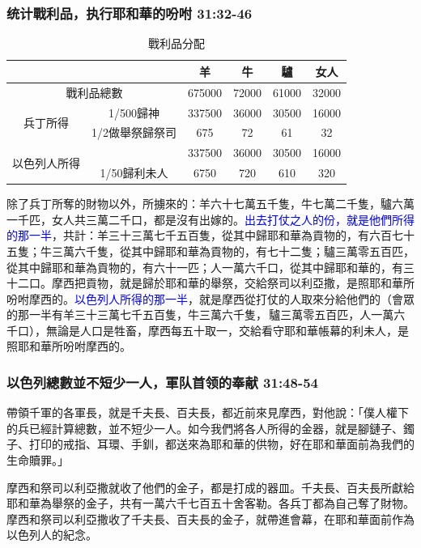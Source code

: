 \subsubsection{统计戰利品，执行耶和華的吩咐 31:32-46}
\begin{table}
\centering
\begin{tabular}{|c|c|c|c|c|c|}
\hline
\hline
\multicolumn{2}{|c|}{}     &羊    &    牛&  驢   & 女人 \\ \hline\hline 
\multicolumn{2}{|c|}{戰利品總數}           &675000&72000 & 61000 & 32000\\ \cline{2-6}\hline
\multirow{2}{*}{兵丁所得}&1/500歸神& 337500&36000&30500&16000 \\ 
\multicolumn{1}{|c|}{}   &1/2做舉祭歸祭司&675    &72   &61   &32 \\ \cline{2-6}\hline
\multirow{2}{*}{以色列人所得}  && 337500 & 36000 &30500 &  16000 \\ 
\multicolumn{1}{|c|}{}         &1/50歸利未人&6750 & 720 &610 &320 \\ \cline{2-6}\hline
\end{tabular}
\caption{戰利品分配 }
\end{table}
除了兵丁所奪的財物以外，所擄來的：羊六十七萬五千隻，牛七萬二千隻，驢六萬一千匹，女人共三萬二千口，都是沒有出嫁的。\textcolor{blue}{出去打仗之人的份，就是他們所得的那一半}，共計：羊三十三萬七千五百隻，從其中歸耶和華為貢物的，有六百七十五隻；牛三萬六千隻，從其中歸耶和華為貢物的，有七十二隻；驢三萬零五百匹，從其中歸耶和華為貢物的，有六十一匹；人一萬六千口，從其中歸耶和華的，有三十二口。摩西把貢物，就是歸於耶和華的舉祭，交給祭司以利亞撒，是照耶和華所吩咐摩西的。\textcolor{blue}{以色列人所得的那一半}，就是摩西從打仗的人取來分給他們的（會眾的那一半有羊三十三萬七千五百隻，牛三萬六千隻， 驢三萬零五百匹，人一萬六千口），無論是人口是牲畜，摩西每五十取一，交給看守耶和華帳幕的利未人，是照耶和華所吩咐摩西的。 	


\subsubsection{以色列總數並不短少一人，軍队首领的奉献 31:48-54}
帶領千軍的各軍長，就是千夫長、百夫長，都近前來見摩西，對他說：「僕人權下的兵已經計算總數，並不短少一人。如今我們將各人所得的金器，就是腳鏈子、鐲子、打印的戒指、耳環、手釧，都送來為耶和華的供物，好在耶和華面前為我們的生命贖罪。」

摩西和祭司以利亞撒就收了他們的金子，都是打成的器皿。千夫長、百夫長所獻給耶和華為舉祭的金子，共有一萬六千七百五十舍客勒。各兵丁都為自己奪了財物。摩西和祭司以利亞撒收了千夫長、百夫長的金子，就帶進會幕，在耶和華面前作為以色列人的紀念。


